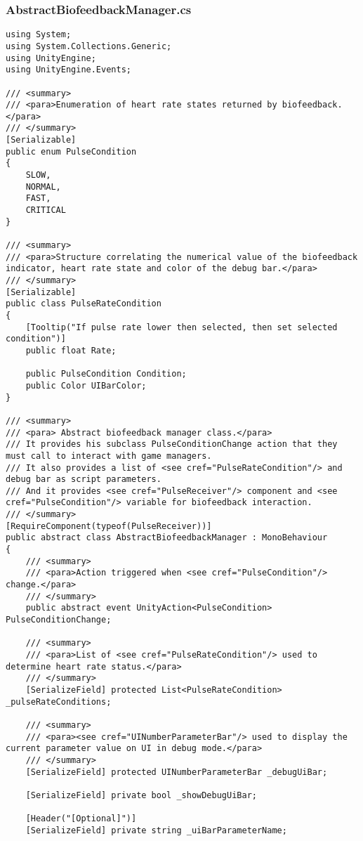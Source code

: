 \subsubsection*{AbstractBiofeedbackManager.cs}
\begin{verbatim}
using System;
using System.Collections.Generic;
using UnityEngine;
using UnityEngine.Events;

/// <summary>
/// <para>Enumeration of heart rate states returned by biofeedback.</para>
/// </summary>
[Serializable]
public enum PulseCondition
{
    SLOW,
    NORMAL,
    FAST,
    CRITICAL
}

/// <summary>
/// <para>Structure correlating the numerical value of the biofeedback indicator, heart rate state and color of the debug bar.</para>
/// </summary>
[Serializable]
public class PulseRateCondition
{
    [Tooltip("If pulse rate lower then selected, then set selected condition")]
    public float Rate;

    public PulseCondition Condition;
    public Color UIBarColor;
}

/// <summary>
/// <para> Abstract biofeedback manager class.</para>
/// It provides his subclass PulseConditionChange action that they must call to interact with game managers.
/// It also provides a list of <see cref="PulseRateCondition"/> and debug bar as script parameters.
/// And it provides <see cref="PulseReceiver"/> component and <see cref="PulseCondition"/> variable for biofeedback interaction.
/// </summary>
[RequireComponent(typeof(PulseReceiver))]
public abstract class AbstractBiofeedbackManager : MonoBehaviour
{
    /// <summary>
    /// <para>Action triggered when <see cref="PulseCondition"/> change.</para>
    /// </summary>
    public abstract event UnityAction<PulseCondition> PulseConditionChange;

    /// <summary>
    /// <para>List of <see cref="PulseRateCondition"/> used to determine heart rate status.</para>
    /// </summary>
    [SerializeField] protected List<PulseRateCondition> _pulseRateConditions;

    /// <summary>
    /// <para><see cref="UINumberParameterBar"/> used to display the current parameter value on UI in debug mode.</para>
    /// </summary>
    [SerializeField] protected UINumberParameterBar _debugUiBar;

    [SerializeField] private bool _showDebugUiBar;

    [Header("[Optional]")] 
    [SerializeField] private string _uiBarParameterName;


\end{verbatim}

